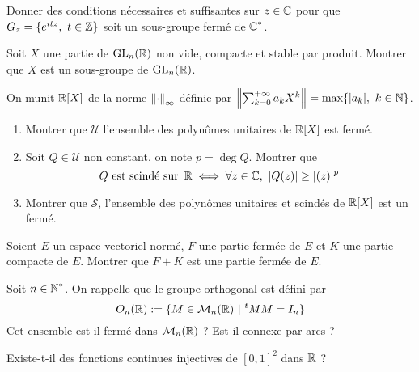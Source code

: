 \begin{exo}
    \label{evn1}
    Donner des conditions nécessaires et suffisantes 
    sur $z\in\operatorname{\mathbb C}$ pour que $G_z=\lbrace e^{itz},\ t\in\Z\rbrace$
    soit un sous-groupe fermé de $\operatorname{\mathbb C}^*$.
\end{exo}

\begin{exo}
    \label{evn2}
    Soit $X$ une partie de $\operatorname{GL}_n(\operatorname{\mathbb R})$ non vide, compacte et stable par produit. Montrer que $X$ est un sous-groupe de $\operatorname{GL}_n(\operatorname{\mathbb R})$.
\end{exo}
    
\begin{exo}
    \label{evn3}
    On munit $\operatorname{\mathbb R}[X]$ de la norme $\left\lVert \cdot\right\rVert_{\infty}$ définie par $\left\lVert \sum_{k=0}^{+\infty}a_kX^k\right\rVert=\text{max}\lbrace |a_k|,\ k\in\operatorname{\mathbb N}\rbrace$.
    \begin{enumerate}
        \item Montrer que $\mathcal U$ l'ensemble des polynômes unitaires de $\operatorname{\mathbb R}[X]$ est fermé.
        \item Soit $Q\in\mathcal U$ non constant, on note $p=\deg Q$. Montrer que 
        \[Q\text{ est scindé sur }\operatorname{\mathbb R}\iff \forall z\in\operatorname{\mathbb C},\ |Q(z)|\geq |\relax(z)|^p\]
        \item Montrer que $\mathcal S$, l'ensemble des polynômes unitaires et scindés de $\operatorname{\mathbb R}[X]$ est un fermé.
    \end{enumerate}
\end{exo}

\begin{exo}
    \label{evn4}
	Soient $E$ un espace vectoriel normé, $F$ une partie fermée de $E$ et $K$ une partie compacte de $E$. Montrer que $F+K$ est une partie fermée de $E$.
\end{exo}

\begin{exo}
    \label{evn5}
	Soit $n\in\operatorname{\mathbb N}^*$. On rappelle que le groupe orthogonal est défini par \[O_n(\operatorname{\mathbb R}):=\lbrace M\in\mathcal M_n(\operatorname{\mathbb R})\ |\ {}^tMM=I_n\rbrace\]
	Cet ensemble est-il fermé dans $\mathcal M_n(\operatorname{\mathbb R})$ ? Est-il connexe par arcs ?
\end{exo}

\begin{exo}
    \label{evn6}
    Existe-t-il des fonctions continues injectives de $[0,1]^2$ dans $\operatorname{\mathbb R}$ ?
\end{exo}
